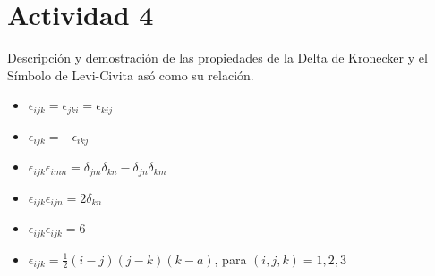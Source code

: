 \documentclass{article}
\begin{document}
\section{Actividad 4}
Descripción y demostración de las propiedades de la Delta de Kronecker y el Símbolo de Levi-Civita asó como su relación.
\begin{itemize}
    \item $\epsilon_{ijk}=\epsilon_{jki}=\epsilon_{kij}$
    \item $\epsilon_{ijk}=-\epsilon_{ikj}$
    \item $\epsilon_{ijk}\epsilon_{imn}=\delta_{jm}\delta_{kn}-\delta_{jn}\delta_{km}$
    \item $\epsilon_{ijk}\epsilon_{ijn}=2\delta_{kn}$
    \item $\epsilon_{ijk}\epsilon_{ijk}=6$
    \item $\epsilon_{ijk}=\frac{1}{2}(i-j)(j-k)(k-a)$, para $(i,j,k)=1,2,3$
\end{itemize}
\newpage
\end{document}
